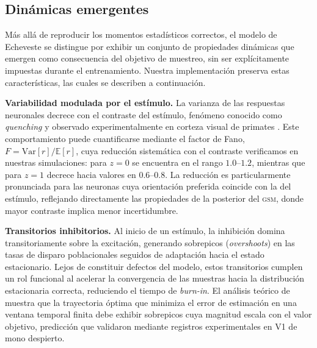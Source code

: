 \documentclass{llncs}
\begin{document}
\subsection{Dinámicas emergentes}

Más allá de reproducir los momentos estadísticos correctos, el modelo
de Echeveste se distingue por exhibir un conjunto de propiedades
dinámicas que emergen como consecuencia del objetivo de muestreo, sin
ser explícitamente impuestas durante el entrenamiento. Nuestra
implementación preserva estas características, las cuales se
describen a continuación.

\textbf{Variabilidad modulada por el estímulo.} La varianza de las
respuestas neuronales decrece con el contraste del estímulo,
fenómeno conocido como \emph{quenching} y observado experimentalmente
en corteza visual de primates \citep{echeveste2020cortical}. Este
comportamiento puede cuantificarse mediante el factor de Fano,
$F = \text{Var}[r] / \mathbb{E}[r]$, cuya reducción sistemática con
el contraste verificamos en nuestras simulaciones: para $z = 0$ se
encuentra en el rango $1.0$--$1.2$, mientras que para $z = 1$ decrece
hacia valores en $0.6$--$0.8$. La reducción es particularmente
pronunciada para las neuronas cuya orientación preferida coincide con
la del estímulo, reflejando directamente las propiedades de la
posterior del \textsc{gsm}, donde mayor contraste implica menor
incertidumbre.

\textbf{Transitorios inhibitorios.} Al inicio de un estímulo, la
inhibición domina transitoriamente sobre la excitación, generando
sobrepicos (\emph{overshoots}) en las tasas de disparo poblacionales
seguidos de adaptación hacia el estado estacionario. Lejos de
constituir defectos del modelo, estos transitorios cumplen un rol
funcional al acelerar la convergencia de las muestras hacia la
distribución estacionaria correcta, reduciendo el tiempo de
\emph{burn-in}. El análisis teórico de \citet{echeveste2020cortical}
muestra que la trayectoria óptima que minimiza el error de estimación
en una ventana temporal finita debe exhibir sobrepicos cuya magnitud
escala con el valor objetivo, predicción que validaron mediante
registros experimentales en V1 de mono despierto.
\end{document}
